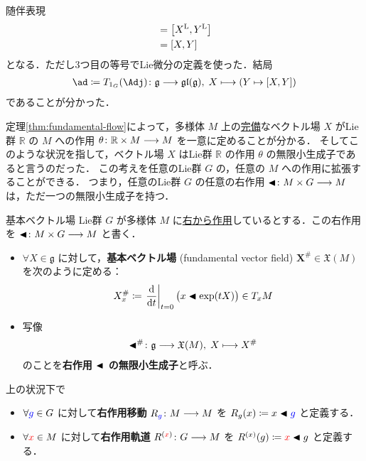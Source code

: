 \documentclass[TQFT_main]{subfiles}
\begin{document}
\begin{myexample}[label=def:Lie-adj]{随伴表現}
\begin{align}
        &= \comm{\Lie{X}}{\Lie{Y}} \\
        &= \comm{X}{Y}
    \end{align}
    となる．ただし3つ目の等号でLie微分の定義を使った．結局
    \begin{align}
        \ad \coloneqq T_{1_G} (\Adj) \colon \mathfrak{g} \lto \mathfrak{gl}(\mathfrak{g}),\; X \lmto (Y \mapsto \comm{X}{Y})
    \end{align}
    であることが分かった．
    
\end{myexample}

定理\ref{thm:fundamental-flow}によって，\cinfty 多様体 $M$ 上の\hyperref[def:vecf-complete]{完備}なベクトル場 $X$ がLie群 $\mathbb{R}$ の $M$ への作用 $\theta \colon \mathbb{R} \times M \longrightarrow M$ を一意に定めることが分かる．
そしてこのような状況を指して，ベクトル場 $X$ はLie群 $\mathbb{R}$ の作用 $\theta$ の無限小生成子であると言うのだった．
この考えを任意のLie群 $G$ の，任意の $M$ への作用に拡張することができる．
つまり，任意のLie群 $G$ の任意の右作用 $\blacktriangleleft \colon M \times G \longrightarrow M$ は，ただ一つの無限小生成子を持つ．

\begin{mydef}[label=def:fundamental-vecf]{基本ベクトル場}
    Lie群 $G$ が\cinfty 多様体 $M$ に\hyperref[def:Lie-action]{右から作用}しているとする．この右作用を $\blacktriangleleft \colon M \times G \longrightarrow M$ と書く．
    \begin{itemize}
        \item $\forall X \in \mathfrak{g}$ に対して，\textbf{基本ベクトル場} (fundamental vector field) $\bm{X^{\#}} \in \mathfrak{X}(M)$ を次のように定める：
        \begin{align}
            X^{\#}_x \coloneqq \eval{\dv{}{t}}_{t=0} \bigl(x \btl \exp(tX)\bigr) \in T_x M
        \end{align}
        \item 写像
        \begin{align}
            \blacktriangleleft^{\#} \colon \mathfrak{g} \longrightarrow \mathfrak{X}(M),\; X \longmapsto X^\#
        \end{align}
        のことを\textbf{右作用 $\blacktriangleleft$ の無限小生成子}と呼ぶ．
    \end{itemize}
    \tcblower
    上の状況下で
    \begin{itemize}
        \item $\forall \textcolor{blue}{g} \in G$ に対して\textbf{右作用移動} $R_{\textcolor{blue}{g}} \colon M \longrightarrow M$ を $R_g (x) \coloneqq x \blacktriangleleft \textcolor{blue}{g}$ と定義する．
        \item $\forall \textcolor{red}{x} \in M$ に対して\textbf{右作用軌道} $R^{(\textcolor{red}{x})} \colon G \longrightarrow M$ を $R^{(x)} (g) \coloneqq \textcolor{red}{x} \blacktriangleleft g$ と定義する．
    \end{itemize}
\end{mydef}
\end{document}
